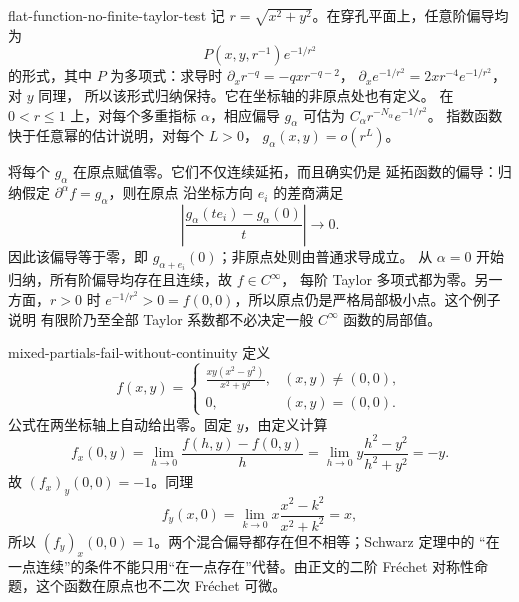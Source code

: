 \begin{solution}{flat-function-no-finite-taylor-test}
记 $r=\sqrt{x^2+y^2}$。在穿孔平面上，任意阶偏导均为
\[
 P(x,y,r^{-1})e^{-1/r^2}
\]
的形式，其中 \(P\) 为多项式：求导时
\(\partial_x r^{-q}=-qx r^{-q-2}\)，
\(\partial_x e^{-1/r^2}=2xr^{-4}e^{-1/r^2}\)，对 \(y\) 同理，
所以该形式归纳保持。它在坐标轴的非原点处也有定义。
在 \(0<r\le1\) 上，对每个多重指标 \(\alpha\)，相应偏导 \(g_\alpha\)
可估为 \(C_\alpha r^{-N_\alpha}e^{-1/r^2}\)。
指数函数快于任意幂的估计说明，对每个 \(L>0\)，
\(g_\alpha(x,y)=o(r^L)\)。

将每个 \(g_\alpha\) 在原点赋值零。它们不仅连续延拓，而且确实仍是
延拓函数的偏导：归纳假定 \(\partial^\alpha f=g_\alpha\)，则在原点
沿坐标方向 \(e_i\) 的差商满足
\[
 \left|\frac{g_\alpha(te_i)-g_\alpha(0)}t\right|\longrightarrow0.
\]
因此该偏导等于零，即 \(g_{\alpha+e_i}(0)\)；非原点处则由普通求导成立。
从 \(\alpha=0\) 开始归纳，所有阶偏导均存在且连续，故 \(f\in C^\infty\)，
每阶 Taylor 多项式都为零。另一方面，$r>0$ 时
$e^{-1/r^2}>0=f(0,0)$，所以原点仍是严格局部极小点。这个例子说明
有限阶乃至全部 Taylor 系数都不必决定一般 $C^\infty$ 函数的局部值。
\end{solution}

\begin{solution}{mixed-partials-fail-without-continuity}
定义
\[
 f(x,y)=
 \begin{cases}
 \displaystyle\frac{xy(x^2-y^2)}{x^2+y^2},&(x,y)\ne(0,0),\\[4pt]
 0,&(x,y)=(0,0).
 \end{cases}
\]
公式在两坐标轴上自动给出零。固定 $y$，由定义计算
\[
 f_x(0,y)=\lim_{h\to0}\frac{f(h,y)-f(0,y)}h
 =\lim_{h\to0}y\frac{h^2-y^2}{h^2+y^2}=-y.
\]
故 $(f_x)_y(0,0)=-1$。同理
\[
 f_y(x,0)=\lim_{k\to0}x\frac{x^2-k^2}{x^2+k^2}=x,
\]
所以 $(f_y)_x(0,0)=1$。两个混合偏导都存在但不相等；Schwarz 定理中的
“在一点连续”的条件不能只用“在一点存在”代替。由正文的二阶
Fréchet 对称性命题，这个函数在原点也不二次 Fréchet 可微。
\end{solution}
